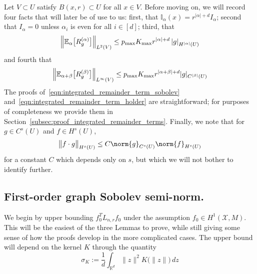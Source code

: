 \documentclass{article}
\newcommand{\Reals}{\mathbb{R}}
\newcommand{\abs}[1]{\left \lvert #1 \right \rvert}
\newcommand{\1}{\mathbf{1}}
\newcommand{\Lap}{L}
\newcommand{\Xset}{\mathcal{X}}
\newcommand{\Leb}{L}
\newcommand{\Ebb}{\mathbb{E}}
\newcommand{\Ibb}{\mathbb{I}}
\theoremstyle{alden}
\theoremstyle{aldenthm}
\theoremstyle{definition}
\theoremstyle{remark}
\begin{document}
Let $V \subset U$ satisfy $B(x,r) \subset U$ for all $x \in V$. Before moving on, we will record four facts that will later be of use to us:  first, that $\Ibb_{\alpha}(x) = r^{\abs{\alpha} + d} I_{\alpha}$; second that $I_{\alpha} = 0$ unless $\alpha_i$ is even for all $i \in [d]$; third, that
\begin{equation}
\label{eqn:integrated_remainder_term_sobolev}
\Bigl\|\Ebb_{\alpha}\bigl[R_g^{(\alpha)}\bigr]\Bigr\|_{\Leb^2(V)} \leq p_{\max} K_{\max} r^{\abs{\alpha} + d} \abs{g}_{H^{\abs{\alpha}}(U)}
\end{equation}
and fourth that
\begin{equation}
\label{eqn:integrated_remainder_term_holder}
\Bigl\|\Ebb_{\alpha + \beta}\bigl[R_g^{(\beta)}\bigr]\Bigr\|_{\Leb^{\infty}(V)} \leq p_{\max} K_{\max} r^{\abs{\alpha + \beta} + d} |g|_{C^{\abs{\beta}}(U)}
\end{equation}
The proofs of~\eqref{eqn:integrated_remainder_term_sobolev} and~\eqref{eqn:integrated_remainder_term_holder} are straightforward; for purposes of completeness we provide them in Section~\ref{subsec:proof_integrated_remainder_terms}.
Finally, we note that for $g \in C^{s}(U)$ and $f \in H^s(U)$, 
\begin{equation}
\label{eqn:product_rule_sobolev}
\bigl\|f \cdot g\bigr\|_{H^s(U)} \leq C \norm{g}_{C^s(U)} \norm{f}_{H^s(U)}
\end{equation}
for a constant $C$ which depends only on $s$, but which we will not bother to identify further.

\subsection{First-order graph Sobolev semi-norm.}
We begin by upper bounding $f_0^T \Lap_{n,r} f_0$ under the assumption $f_0 \in H^1(\Xset,M)$. This will be the easiest of the three Lemmas to prove, while still giving some sense of how the proofs develop in the more complicated cases. The upper bound will depend on the kernel $K$ through the quantity
\begin{equation*}
\sigma_K := \frac{1}{d}\int_{\Reals^d} \|z\|^2 K\bigl(\|z\|\bigr) \,dz
\end{equation*}
\end{document}
